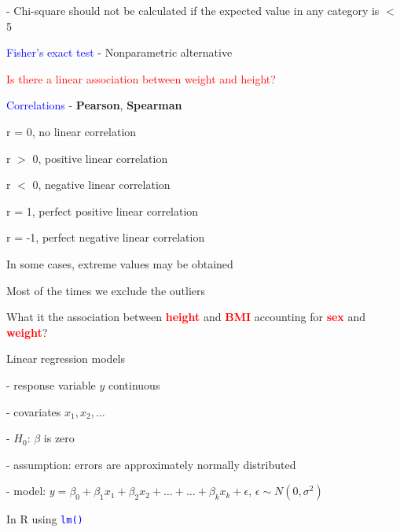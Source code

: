 \documentclass{presentatiesmetlogo}
\newcommand{\code}[1]{\textcolor{blue}{\texttt{#1}}}
\newcommand{\redbf}[1]{\textcolor{red}{\textbf{#1}}}
\begin{document}
\item[-] Chi-square should not be calculated if the expected value in any category is $<$ 5
\newline
\newline
\eitemt
\item \textcolor{blue}{Fisher's exact test} -  Nonparametric alternative
\eitemt
\eitem
\bitem
\item \textcolor{red}{Is there a linear association between weight and height?}
\bitemt
\item \textcolor{blue}{Correlations} - \textbf{Pearson}, \textbf{Spearman}
\newline
\newline
\bitem
\item r = 0, no linear correlation
\item r $>$ 0, positive linear correlation
\item r $<$ 0, negative linear correlation
\item r = 1, perfect positive linear correlation
\item r = -1, perfect negative linear correlation
\eitem
\eitemt
\eitem
\bitem
\item In some cases, extreme values may be obtained
\newline
\newline
\item Most of the times we exclude the outliers
\eitem
\bitem
\item What it the association between \redbf{height} and \redbf{BMI} accounting for \redbf{sex} and \redbf{weight}?
\bitemt
\item Linear regression models
\bitemt
\item[-] response variable $y$ continuous
\item[-] covariates $x_1, x_2, \dots$
\item[-] $H_0$: $\beta$ is zero
\item[-] assumption: errors are approximately normally distributed
\item[-] model: $y = \beta_0 + \beta_1x_1 + \beta_2x_2 + \dots + \dots + \beta_kx_k + \epsilon$, $\epsilon \sim N(0,\sigma^2)$
\newline
\eitemt
\item In R using \code{lm()}
\end{document}
